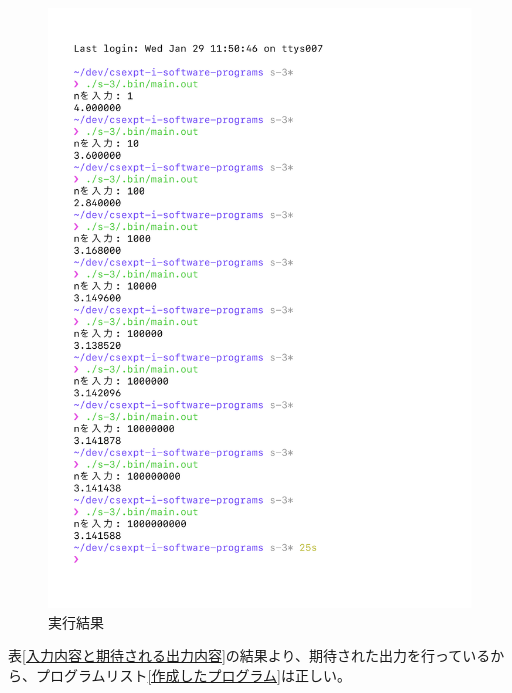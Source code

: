 \begin{figure}[H]
    \centering
    \includegraphics[width=0.8\hsize, pagebox=mediabox, page=1]{main_result_img.pdf}
    \caption{実行結果}
    \label{実行結果}
\end{figure}

表\ref{入力内容と期待される出力内容}の結果より、期待された出力を行っているから、プログラムリスト\ref{作成したプログラム}は正しい。


